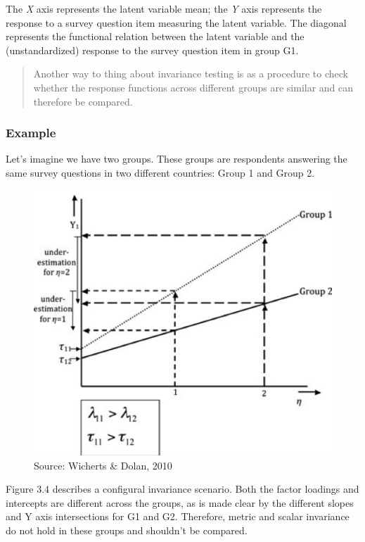 \documentclass[
]{book}
\begin{document}
The \emph{X} axis represents the latent variable mean; the \emph{Y} axis represents the response to a survey question item measuring the latent variable. The diagonal represents the functional relation between the latent variable and the (unstandardized) response to the survey question item in group G1.

\begin{quote}
Another way to thing about invariance testing is as a procedure to check whether the response functions across different groups are similar and can therefore be compared.
\end{quote}

\hypertarget{example}{%
\subsubsection{Example}\label{example}}

Let's imagine we have two groups. These groups are respondents answering the same survey questions in two different countries: Group 1 and Group 2.

\begin{figure}
\includegraphics[width=0.8\linewidth]{Picture2} \caption{Source: Wicherts & Dolan, 2010}\label{fig:non}
\end{figure}

Figure 3.4 describes a configural invariance scenario. Both the factor loadings and intercepts are different across the groups, as is made clear by the different slopes and Y axis intersections for G1 and G2. Therefore, metric and scalar invariance do not hold in these groups and shouldn't be compared.
\end{document}
